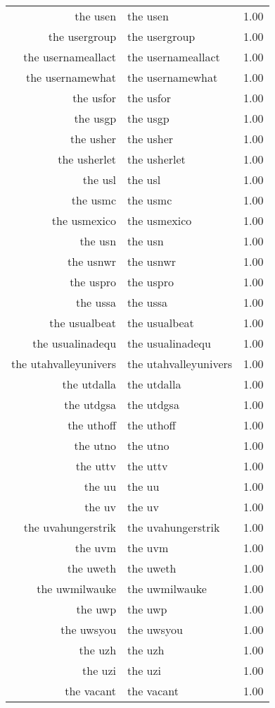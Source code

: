 \begin{table}[ht]
\begin{tabular}{rlr}
  the usen & the usen & 1.00 \\ 
  the usergroup & the usergroup & 1.00 \\ 
  the usernameallact & the usernameallact & 1.00 \\ 
  the usernamewhat & the usernamewhat & 1.00 \\ 
  the usfor & the usfor & 1.00 \\ 
  the usgp & the usgp & 1.00 \\ 
  the usher & the usher & 1.00 \\ 
  the usherlet & the usherlet & 1.00 \\ 
  the usl & the usl & 1.00 \\ 
  the usmc & the usmc & 1.00 \\ 
  the usmexico & the usmexico & 1.00 \\ 
  the usn & the usn & 1.00 \\ 
  the usnwr & the usnwr & 1.00 \\ 
  the uspro & the uspro & 1.00 \\ 
  the ussa & the ussa & 1.00 \\ 
  the usualbeat & the usualbeat & 1.00 \\ 
  the usualinadequ & the usualinadequ & 1.00 \\ 
  the utahvalleyunivers & the utahvalleyunivers & 1.00 \\ 
  the utdalla & the utdalla & 1.00 \\ 
  the utdgsa & the utdgsa & 1.00 \\ 
  the uthoff & the uthoff & 1.00 \\ 
  the utno & the utno & 1.00 \\ 
  the uttv & the uttv & 1.00 \\ 
  the uu & the uu & 1.00 \\ 
  the uv & the uv & 1.00 \\ 
  the uvahungerstrik & the uvahungerstrik & 1.00 \\ 
  the uvm & the uvm & 1.00 \\ 
  the uweth & the uweth & 1.00 \\ 
  the uwmilwauke & the uwmilwauke & 1.00 \\ 
  the uwp & the uwp & 1.00 \\ 
  the uwsyou & the uwsyou & 1.00 \\ 
  the uzh & the uzh & 1.00 \\ 
  the uzi & the uzi & 1.00 \\ 
  the vacant & the vacant & 1.00 \\ 

\end{tabular}
\end{table}
